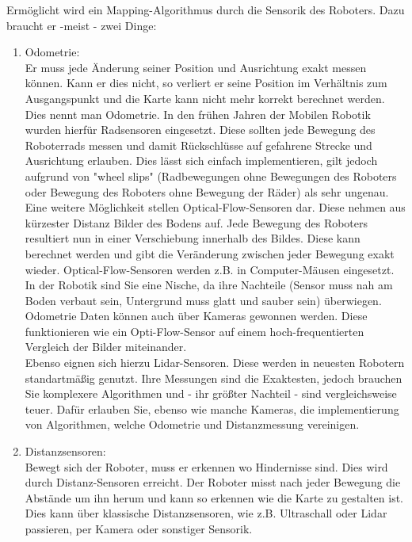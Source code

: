 \documentclass[twoside,11pt, a4paper]{report}
\begin{document}
	Ermöglicht wird ein Mapping-Algorithmus durch die Sensorik des Roboters. Dazu braucht er -meist - zwei Dinge: 
	\begin{enumerate}
		\item Odometrie:\\
		Er muss jede Änderung seiner Position und Ausrichtung exakt messen können. Kann er dies nicht, so verliert er seine Position im Verhältnis zum Ausgangspunkt und die Karte kann nicht mehr korrekt berechnet werden. Dies nennt man Odometrie. In den frühen Jahren der Mobilen Robotik wurden hierfür Radsensoren eingesetzt. Diese sollten jede Bewegung des Roboterrads messen und damit Rückschlüsse auf gefahrene Strecke und Ausrichtung erlauben. Dies lässt sich einfach implementieren, gilt jedoch aufgrund von "wheel slips" (Radbewegungen ohne Bewegungen des Roboters oder Bewegung des Roboters ohne Bewegung der Räder) als sehr ungenau. \\
		Eine weitere Möglichkeit stellen Optical-Flow-Sensoren dar. Diese nehmen aus kürzester Distanz Bilder des Bodens auf. Jede Bewegung des Roboters resultiert nun in einer Verschiebung innerhalb des Bildes. Diese kann berechnet werden und gibt die Veränderung zwischen jeder Bewegung exakt wieder. Optical-Flow-Sensoren werden z.B. in Computer-Mäusen eingesetzt. In der Robotik sind Sie eine Nische, da ihre Nachteile (Sensor muss nah am Boden verbaut sein, Untergrund muss glatt und sauber sein) überwiegen. \\
		Odometrie Daten können auch über Kameras gewonnen werden. Diese funktionieren wie ein Opti-Flow-Sensor auf einem hoch-frequentierten Vergleich der Bilder miteinander. \\
		Ebenso eignen sich hierzu Lidar-Sensoren. Diese werden in neuesten Robotern standartmäßig genutzt. Ihre Messungen sind die Exaktesten, jedoch brauchen Sie komplexere Algorithmen und - ihr größter Nachteil - sind vergleichsweise teuer. Dafür erlauben Sie, ebenso wie manche Kameras, die implementierung von Algorithmen, welche Odometrie und Distanzmessung vereinigen. 
		\item Distanzsensoren:\\
		Bewegt sich der Roboter, muss er erkennen wo Hindernisse sind. Dies wird durch Distanz-Sensoren erreicht. Der Roboter misst nach jeder Bewegung die Abstände um ihn herum und kann so erkennen wie die Karte zu gestalten ist. Dies kann über klassische Distanzsensoren, wie z.B. Ultraschall oder Lidar passieren, per Kamera oder sonstiger Sensorik. 
	\end{enumerate}
	
\end{document}
